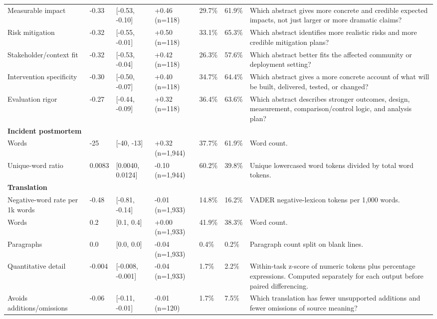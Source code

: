 \begin{longtable}{lllllll}
Measurable impact & -0.33 & [-0.53, -0.10] & +0.46 (n=118) & 29.7\% & 61.9\% & Which abstract gives more concrete and credible expected impacts, not just larger or more dramatic claims? \\
Risk mitigation & -0.32 & [-0.55, -0.01] & +0.50 (n=118) & 33.1\% & 65.3\% & Which abstract identifies more realistic risks and more credible mitigation plans? \\
Stakeholder/context fit & -0.32 & [-0.53, -0.04] & +0.42 (n=118) & 26.3\% & 57.6\% & Which abstract better fits the affected community or deployment setting? \\
Intervention specificity & -0.30 & [-0.50, -0.07] & +0.40 (n=118) & 34.7\% & 64.4\% & Which abstract gives a more concrete account of what will be built, delivered, tested, or changed? \\
Evaluation rigor & -0.27 & [-0.44, -0.09] & +0.32 (n=118) & 36.4\% & 63.6\% & Which abstract describes stronger outcomes, design, measurement, comparison/control logic, and analysis plan? \\
\multicolumn{7}{l}{\textbf{Incident postmortem}} \\
Words & -25 & [-40, -13] & +0.32 (n=1,944) & 37.7\% & 61.9\% & Word count. \\
Unique-word ratio & 0.0083 & [0.0040, 0.0124] & -0.10 (n=1,944) & 60.2\% & 39.8\% & Unique lowercased word tokens divided by total word tokens. \\
\multicolumn{7}{l}{\textbf{Translation}} \\
Negative-word rate per 1k words & -0.48 & [-0.81, -0.14] & -0.01 (n=1,933) & 14.8\% & 16.2\% & VADER negative-lexicon tokens per 1,000 words. \\
Words & 0.2 & [0.1, 0.4] & +0.00 (n=1,933) & 41.9\% & 38.3\% & Word count. \\
Paragraphs & 0.0 & [0.0, 0.0] & -0.04 (n=1,933) & 0.4\% & 0.2\% & Paragraph count split on blank lines. \\
Quantitative detail & -0.004 & [-0.008, -0.001] & -0.04 (n=1,933) & 1.7\% & 2.2\% & Within-task z-score of numeric tokens plus percentage expressions. Computed separately for each output before paired differencing. \\
Avoids additions/omissions & -0.06 & [-0.11, -0.01] & -0.01 (n=120) & 1.7\% & 7.5\% & Which translation has fewer unsupported additions and fewer omissions of source meaning? \\
\end{longtable}
